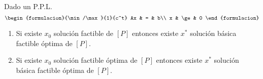 \begin{teorema}
  \label{t2:2}
  Dado un P.P.L.
  $$
  \begin{formulacion}{\min/\max}{1}{c^t}
    Ax & = & b\\
    x & \ge & 0
  \end{formulacion}$$
  
  \begin{enumerate}
    \item Si existe $x_0$ solución factible de $[P]$ entonces existe
    $x^*$ solución básica factible óptima de $[P]$.

    \item Si existe $x_0$ solución factible óptima de $[P]$ entonces
    existe $x^*$ solución básica factible óptima de $[P]$.
  \end{enumerate}
\end{teorema}


